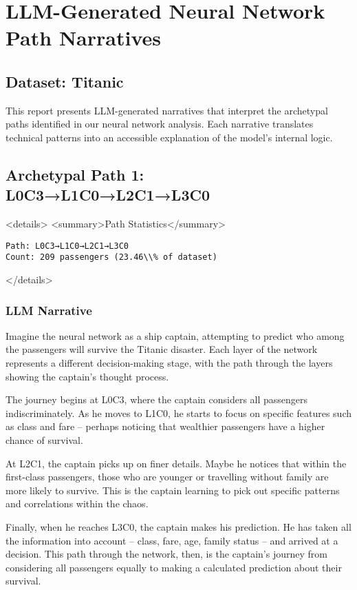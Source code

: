 \section*{LLM-Generated Neural Network Path Narratives}

\subsection*{Dataset: Titanic}

This report presents LLM-generated narratives that interpret the archetypal paths
identified in our neural network analysis. Each narrative translates technical
patterns into an accessible explanation of the model's internal logic.

\subsection*{Archetypal Path 1: L0C3→L1C0→L2C1→L3C0}

<details>
<summary>Path Statistics</summary>

\begin{verbatim}
Path: L0C3→L1C0→L2C1→L3C0
Count: 209 passengers (23.46\\% of dataset)
\end{verbatim}
</details>

\subsubsection*{LLM Narrative}

Imagine the neural network as a ship captain, attempting to predict who among the passengers will survive the Titanic disaster. Each layer of the network represents a different decision-making stage, with the path through the layers showing the captain's thought process.

The journey begins at L0C3, where the captain considers all passengers indiscriminately. As he moves to L1C0, he starts to focus on specific features such as class and fare – perhaps noticing that wealthier passengers have a higher chance of survival.

At L2C1, the captain picks up on finer details. Maybe he notices that within the first-class passengers, those who are younger or travelling without family are more likely to survive. This is the captain learning to pick out specific patterns and correlations within the chaos.

Finally, when he reaches L3C0, the captain makes his prediction. He has taken all the information into account – class, fare, age, family status – and arrived at a decision. This path through the network, then, is the captain's journey from considering all passengers equally to making a calculated prediction about their survival.

